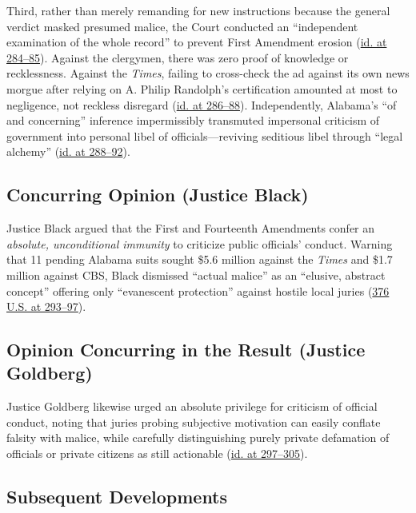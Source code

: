 \documentclass[12pt]{article}
\begin{document}
Third, rather than merely remanding for new instructions because the general verdict masked presumed malice, the Court conducted an ``independent examination of the whole record'' to prevent First Amendment erosion (\href{https://supreme.justia.com/cases/federal/us/376/254/}{id. at 284--85}). Against the clergymen, there was zero proof of knowledge or recklessness. Against the \textit{Times}, failing to cross-check the ad against its own news morgue after relying on A. Philip Randolph's certification amounted at most to negligence, not reckless disregard (\href{https://supreme.justia.com/cases/federal/us/376/254/}{id. at 286--88}). Independently, Alabama's ``of and concerning'' inference impermissibly transmuted impersonal criticism of government into personal libel of officials---reviving seditious libel through ``legal alchemy'' (\href{https://www.law.cornell.edu/supremecourt/text/376/254}{id. at 288--92}).

\subsection{Concurring Opinion (Justice Black)}

Justice Black argued that the First and Fourteenth Amendments confer an \textit{absolute, unconditional immunity} to criticize public officials' conduct. Warning that 11 pending Alabama suits sought \$5.6 million against the \textit{Times} and \$1.7 million against CBS, Black dismissed ``actual malice'' as an ``elusive, abstract concept'' offering only ``evanescent protection'' against hostile local juries (\href{https://supreme.justia.com/cases/federal/us/376/254/}{376 U.S. at 293--97}).

\subsection{Opinion Concurring in the Result (Justice Goldberg)}

Justice Goldberg likewise urged an absolute privilege for criticism of official conduct, noting that juries probing subjective motivation can easily conflate falsity with malice, while carefully distinguishing purely private defamation of officials or private citizens as still actionable (\href{https://www.law.cornell.edu/supremecourt/text/376/254}{id. at 297--305}).

\subsection{Subsequent Developments}
\end{document}
